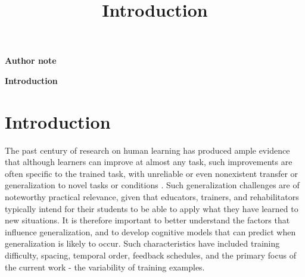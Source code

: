 \documentclass[
  12pt,
  letterpaper,
]{article}
\title{Introduction}
\date{}
\begin{document}

\begin{titlepage}
\center

{\let\newpage\relax\maketitle}

\thispagestyle{title}

\vspace{0.25in}


\vspace{0.5in}

\begin{center}

\textbf{Author note}


\end{center}




\vfill  %

\end{titlepage}

\doublespacing


\begin{center}
\singlespacing
\textbf{Introduction}
\end{center}




\section{Introduction}\label{introduction}

The past century of research on human learning has produced ample
evidence that although learners can improve at almost any task, such
improvements are often specific to the trained task, with unreliable or
even nonexistent transfer or generalization to novel tasks or conditions
\autocite{barnettWhenWhereWe2002,dettermanCaseProsecutionTransfer1993}.
Such generalization challenges are of noteworthy practical relevance,
given that educators, trainers, and rehabilitators typically intend for
their students to be able to apply what they have learned to new
situations. It is therefore important to better understand the factors
that influence generalization, and to develop cognitive models that can
predict when generalization is likely to occur. Such characteristics
have included training difficulty, spacing, temporal order, feedback
schedules, and the primary focus of the current work - the variability
of training examples.
\end{document}
